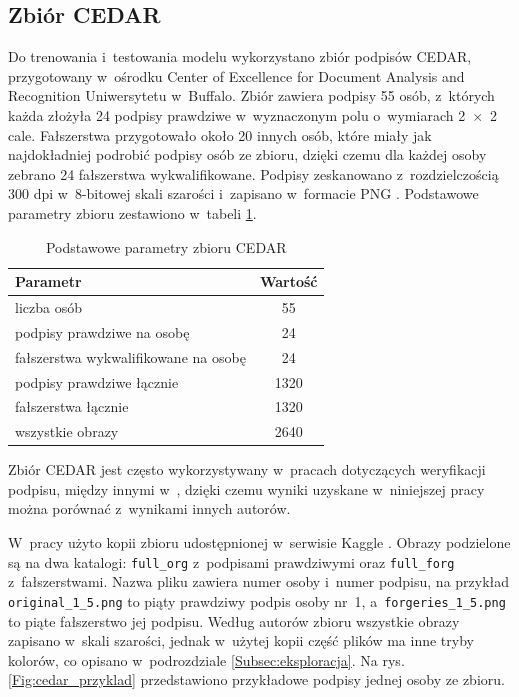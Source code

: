 \documentclass[12pt, twoside, openright]{article}
\begin{document}
\subsection{Zbiór CEDAR}
\label{Subsec:cedar}

Do trenowania i~testowania modelu wykorzystano zbiór podpisów CEDAR, przygotowany w~ośrodku Center of Excellence for Document Analysis and Recognition Uniwersytetu w~Buffalo.
Zbiór zawiera podpisy 55 osób, z~których każda złożyła 24 podpisy prawdziwe w~wyznaczonym polu o~wymiarach 2~$\times$~2 cale.
Fałszerstwa przygotowało około 20 innych osób, które miały jak najdokładniej podrobić podpisy osób ze zbioru, dzięki czemu dla każdej osoby zebrano 24 fałszerstwa wykwalifikowane.
Podpisy zeskanowano z~rozdzielczością 300 dpi w~8-bitowej skali szarości i~zapisano w~formacie PNG \cite{kalera2004}.
Podstawowe parametry zbioru zestawiono w~tabeli \ref{Tab:cedar}.

\begin{table}[ht]
\caption{Podstawowe parametry zbioru CEDAR}
\centering
	\begin{tabular}{|l|c|}
		\hline
		Parametr & Wartość \\
		\hline
		liczba osób & 55 \\
		podpisy prawdziwe na osobę & 24 \\
		fałszerstwa wykwalifikowane na osobę & 24 \\
		podpisy prawdziwe łącznie & 1320 \\
		fałszerstwa łącznie & 1320 \\
		wszystkie obrazy & 2640 \\
		\hline
	\end{tabular}
\label{Tab:cedar}
\end{table}

Zbiór CEDAR jest często wykorzystywany w~pracach dotyczących weryfikacji podpisu, między innymi w~\cite{dey2017,hafemann2017features}, dzięki czemu wyniki uzyskane w~niniejszej pracy można porównać z~wynikami innych autorów.

W~pracy użyto kopii zbioru udostępnionej w~serwisie Kaggle \cite{cedarkaggle}.
Obrazy podzielone są na dwa katalogi: \texttt{full\_org} z~podpisami prawdziwymi oraz \texttt{full\_forg} z~fałszerstwami.
Nazwa pliku zawiera numer osoby i~numer podpisu, na przykład \texttt{original\_1\_5.png} to piąty prawdziwy podpis osoby nr~1, a~\texttt{forgeries\_1\_5.png} to piąte fałszerstwo jej podpisu.
Według autorów zbioru wszystkie obrazy zapisano w~skali szarości, jednak w~użytej kopii część plików ma inne tryby kolorów, co opisano w~podrozdziale \ref{Subsec:eksploracja}.
Na rys. \ref{Fig:cedar_przyklad} przedstawiono przykładowe podpisy jednej osoby ze zbioru.
\end{document}
